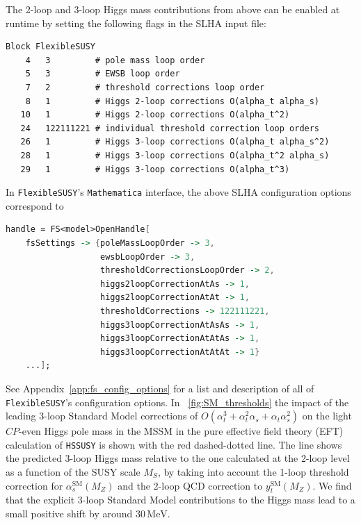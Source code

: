 \documentclass[final,3p,11pt,pdflatex]{elsarticle}
\makeatletter
\newcommand{\modelname}[1]{\texttt{#1}\@\xspace}
\newcommand{\fs}{\texttt{FlexibleSUSY}\@\xspace}
\newcommand{\HSSUSY}{\modelname{HSSUSY}}
\newcommand{\mathematica}{\texttt{Ma\-the\-ma\-ti\-ca}\xspace}
\newcommand{\unit}[1]{\,\text{#1}}      %
\newcommand{\SM}{\ensuremath{\text{SM}}\xspace}
\newcommand{\MS}{\ensuremath{M_S}\xspace}
\newcommand{\figref}[1]{\figurename~\ref{#1}}
\newcommand{\appref}[1]{Appendix~\ref{#1}}
\newcommand{\CP}{\ensuremath{CP}\xspace}
\def\at{\alpha_t}
\def\as{\alpha_s}
\makeatother
\begin{document}
The 2-loop and 3-loop Higgs mass contributions from above can be
enabled at runtime by setting the following flags in the SLHA input
file:
%
\begin{lstlisting}
Block FlexibleSUSY
    4   3         # pole mass loop order
    5   3         # EWSB loop order
    7   2         # threshold corrections loop order
    8   1         # Higgs 2-loop corrections O(alpha_t alpha_s)
   10   1         # Higgs 2-loop corrections O(alpha_t^2)
   24   122111221 # individual threshold correction loop orders
   26   1         # Higgs 3-loop corrections O(alpha_t alpha_s^2)
   28   1         # Higgs 3-loop corrections O(alpha_t^2 alpha_s)
   29   1         # Higgs 3-loop corrections O(alpha_t^3)
\end{lstlisting}
%
In \fs's \mathematica interface, the above SLHA configuration options
correspond to
%
\begin{lstlisting}[language=Mathematica]
handle = FS<model>OpenHandle[
    fsSettings -> {poleMassLoopOrder -> 3,
                   ewsbLoopOrder -> 3,
                   thresholdCorrectionsLoopOrder -> 2,
                   higgs2loopCorrectionAtAs -> 1,
                   higgs2loopCorrectionAtAt -> 1,
                   thresholdCorrections -> 122111221,
                   higgs3loopCorrectionAtAsAs -> 1,
                   higgs3loopCorrectionAtAtAs -> 1,
                   higgs3loopCorrectionAtAtAt -> 1}
    ...];
\end{lstlisting}
%
See \appref{app:fs_config_options} for a list and description of
all of \fs's configuration options.
%
In \figref{fig:SM_thresholds} the impact of the leading 3-loop
Standard Model corrections of $O(\at^3 + \at^2 \as + \at \as^2)$ on
the light \CP-even Higgs pole mass in the MSSM in the pure effective
field theory (EFT) calculation of \HSSUSY is shown with the red
dashed-dotted line.  The line shows the predicted 3-loop Higgs mass
relative to the one calculated at the 2-loop level as a function of
the SUSY scale \MS, by taking into account the 1-loop threshold
correction for $\as^{\SM}(M_Z)$ and the 2-loop QCD correction to
$y_t^{\SM}(M_Z)$.  We find that the explicit 3-loop Standard Model
contributions to the Higgs mass lead to a small positive shift by
around $30\unit{MeV}$.
%
\end{document}
